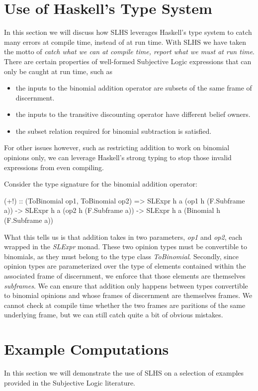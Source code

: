 \documentclass[thesis.tex]{subfiles}
\begin{document}
\section{Use of Haskell's Type System}

In this section we will discuss how SLHS leverages Haskell's type system to catch many errors
at compile time, instead of at run time. With SLHS we have taken the motto of \emph{catch what we
can at compile time, report what we must at run time}. There are certain properties of well-formed
Subjective Logic expressions that can only be caught at run time, such as

\begin{itemize}
  \item the inputs to the binomial addition operator are subsets of the same frame
    of discernment.
  \item the inputs to the transitive discounting operator have different belief
    owners.
  \item the subset relation required for binomial subtraction is satisfied.
\end{itemize}

For other issues however, such as restricting addition to work on binomial opinions only, we can
leverage Haskell's strong typing to stop those invalid expressions from even compiling.

Consider the type signature for the binomial addition operator:

\begin{spec}
(+!) :: (ToBinomial op1, ToBinomial op2)
       => SLExpr h a (op1 h (F.Subframe a))
       -> SLExpr h a (op2 h (F.Subframe a))
       -> SLExpr h a (Binomial h (F.Subframe a))
\end{spec}

What this tells us is that addition takes in two parameters, \emph{op1} and \emph{op2}, each wrapped in
the \emph{SLExpr} monad. These two opinion types must be convertible to binomials, as they must belong to
the type class \emph{ToBinomial}. Secondly, since opinion types are parameterized over the type of elements
contained within the associated frame of discernment, we enforce that those elements are themselves
\emph{subframes}. We can ensure that addition only happens between types convertible to binomial opinions
and whose frames of discernment are themselves frames. We cannot check at compile time whether the two
frames are paritions of the same underlying frame, but we can still catch quite a bit of obvious mistakes.




\section{Example Computations}

In this section we will demonstrate the use of SLHS on a selection of examples provided in the
Subjective Logic literature.




\end{document}
